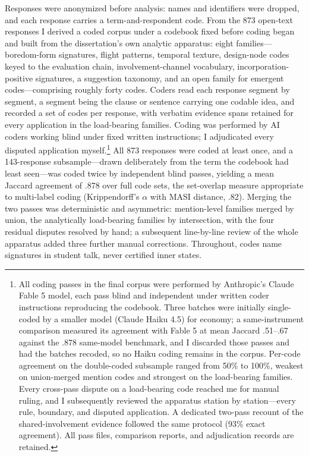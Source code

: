 Responses were anonymized before analysis: names and identifiers were dropped,
and each response carries a term-and-respondent code. From the 873 open-text
responses I derived a coded corpus under a codebook fixed before coding began
and built from the dissertation's own analytic apparatus: eight
families---boredom-form signatures, flight patterns, temporal texture,
design-node codes keyed to the evaluation chain, involvement-channel
vocabulary, incorporation-positive signatures, a suggestion taxonomy, and an
open family for emergent codes---comprising roughly forty codes. Coders read
each response segment by segment, a segment being the clause or sentence
carrying one codable idea, and recorded a set of codes per response, with
verbatim evidence spans retained for every application in the load-bearing
families. Coding was performed by AI coders working blind under fixed written
instructions; I adjudicated every disputed application myself.\footnote{All
coding passes in the final corpus were performed by Anthropic's Claude Fable 5
model, each pass blind and independent under written coder instructions
reproducing the codebook. Three batches were initially single-coded by a
smaller model (Claude Haiku 4.5) for economy; a same-instrument comparison
measured its agreement with Fable 5 at mean Jaccard .51--.67 against the .878
same-model benchmark, and I discarded those passes and had the batches
recoded, so no Haiku coding remains in the corpus. Per-code agreement on the
double-coded subsample ranged from 50\% to 100\%, weakest on union-merged
mention codes and strongest on the load-bearing families. Every cross-pass
dispute on a load-bearing code reached me for manual ruling, and I
subsequently reviewed the apparatus station by station---every rule, boundary,
and disputed application. A dedicated two-pass recount of the
shared-involvement evidence followed the same protocol (93\% exact agreement).
All pass files, comparison reports, and adjudication records are retained.}
All 873 responses were coded at least once, and a 143-response
subsample---drawn deliberately from the term the codebook had least seen---was
coded twice by independent blind passes, yielding a mean Jaccard agreement of
.878 over full code sets, the set-overlap measure appropriate to multi-label
coding (Krippendorff's $\alpha$ with MASI distance, .82). Merging the two
passes was deterministic and asymmetric: mention-level families merged by
union, the analytically load-bearing families by intersection, with the four
residual disputes resolved by hand; a subsequent line-by-line review of the
whole apparatus added three further manual corrections. Throughout, codes name
signatures in student talk, never certified inner states.

